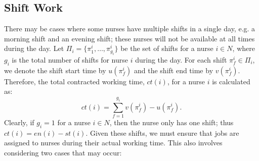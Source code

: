 \documentclass[a4paper,11pt,authoryear]{elsarticle}
\begin{document}
\subsection{Shift Work}
\label{sub:shiftwork}
\noindent There may be cases where some nurses have multiple shifts in a single day, e.g. a morning shift and an evening shift; these nurses will not be available at all times during the day. Let $\Pi_i = \{\pi_1^i,\dotsc, \pi_{g_i}^i\}$ be the set of shifts for a nurse $i \in N$, where $g_i$ is the total number of shifts for nurse $i$ during the day. For each shift $\pi_f^i \in \Pi_i$, we denote the shift start time by $u(\pi_f^i)$ and the shift end time by $v(\pi_f^i)$. Therefore, the total contracted working time, $ct(i)$, for a nurse $i$ is calculated as:
\begin{equation}
	ct(i) = \displaystyle\sum_{f=1}^{g_i} v(\pi_f^i) - u(\pi_f^i). \label{eq:contractedworkingtime}
\end{equation}
\noindent Clearly, if $g_i = 1$ for a nurse $i \in N$, then the nurse only has one shift; thus $ct(i) = en(i)-st(i)$. Given these shifts, we must ensure that jobs are assigned to nurses during their actual working time. This also involves considering two cases that may occur: 
\begin{enumerate}[label={(\arabic*)}]
\end{enumerate}
\end{document}
